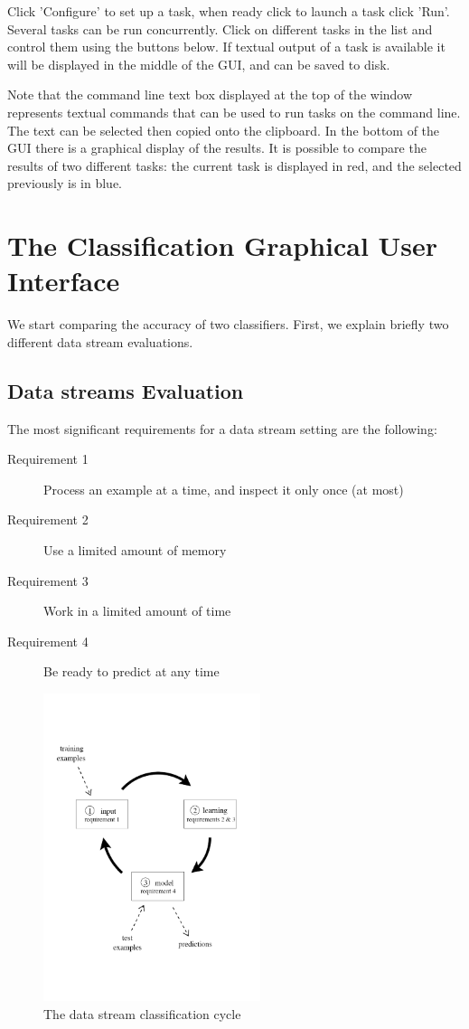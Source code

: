 \documentclass[a4paper,12pt]{article}
\begin{document}
Click 'Configure' to set up a task, when ready click to launch a task click 'Run'. Several tasks can be run concurrently. 
Click on different tasks in the list and control them using the buttons below.
 If textual output of a task is available it will be displayed in the middle of the GUI, and can be saved to disk.

Note that the command line text box displayed at the top of the window represents textual commands that can be used to run tasks on the command line.
 The text can be selected then copied onto the clipboard. In the bottom of the GUI there is a graphical display of the results. It is possible
to compare the results of two different tasks: the current task is displayed in red, and the selected previously is in blue. 

\section{The Classification Graphical User Interface}

We start comparing the accuracy of two classifiers. First, we explain briefly two different data stream evaluations.%

\subsection{Data streams Evaluation}
The most significant requirements for a data stream setting are the following: 
\begin{description}
\item[Requirement 1] Process an example at a time, and inspect
 it only once (at most)
\item[Requirement 2] Use a limited amount of memory
\item[Requirement 3] Work in a limited amount of time
\item[Requirement 4] Be ready to predict at any time
\end{description}
\begin{figure}[t]
\begin{center} 
\includegraphics[height=9cm]{figures/Frame.pdf}
\end{center} 
\caption{The data stream classification cycle}
\label{fig:cycle}
\end{figure} 
\end{document}
